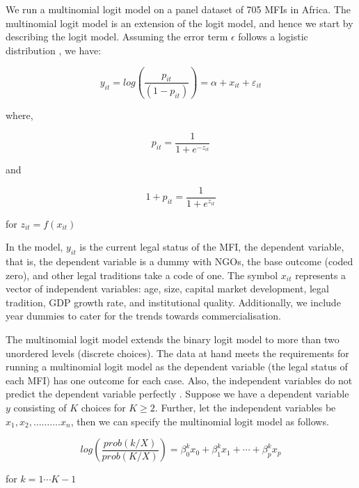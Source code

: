 \documentclass[a4paper, nobind]{templates/ociamthesis}
\begin{document}
We run a multinomial logit model on a panel dataset of 705 MFIs in Africa. The multinomial logit model is an extension of the logit model, and hence we start by describing the logit model. Assuming the error term \(\epsilon\) follows a logistic distribution \autocite{czepiel2002maximum}, we have:

\begin{equation}
y_{it} = log(\frac{p_{it}}{(1-p_{it})} ) = \alpha + x_{it} + \varepsilon_{it}
\end{equation}

where,

\begin{equation}
p_{it}  =  \frac{1}{1 +  e^{- z_{it} } } 
\end{equation}

and

\begin{equation}
1 + p_{it}  =  \frac{1}{1 +  e^{z_{it} } }
\end{equation}

for \(z_{it} = f(x_{it})\)

In the model, \(y_{it}\) is the current legal status of the MFI, the dependent variable, that is, the dependent variable is a dummy with NGOs, the base outcome (coded zero), and other legal traditions take a code of one. The symbol \(x_{it}\) represents a vector of independent variables: age, size, capital market development, legal tradition, GDP growth rate, and institutional quality. Additionally, we include year dummies to cater for the trends towards commercialisation.

The multinomial logit model extends the binary logit model to more than two unordered levels (discrete choices). The data at hand meets the requirements for running a multinomial logit model as the dependent variable (the legal status of each MFI) has one outcome for each case. Also, the independent variables do not predict the dependent variable perfectly \autocite{petrucci2009primer}. Suppose we have a dependent variable \(y\) consisting of \(K\) choices for \(K \geqslant 2\). Further, let the independent variables be \(x_1, x_2,………. x_n\), then we can specify the multinomial logit model as follows.

\begin{equation}
log(\frac{prob(k/X)}{prob(K/X)}) =   \beta_{0}^{k}  x_{0}  + \beta_{1}^{k}  x_{1} +  \cdots + \beta_{p}^{k}  x_{p}
\end{equation}

for \(k = 1 \cdots K-1\)
\end{document}
